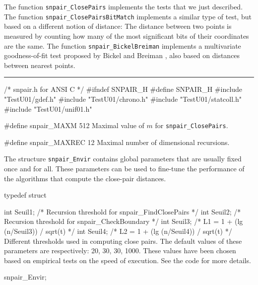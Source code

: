 The function {\tt snpair\_ClosePairs} implements the tests that we
just described.  The function {\tt snpair\_ClosePairsBitMatch}
implements a similar type of test, but based on a different notion of
distance: The distance between two points is measured by counting
how many of the most significant bits of their coordinates are the same.
The function {\tt snpair\_BickelBreiman} implements a multivariate
goodness-of-fit test proposed by Bickel and Breiman \cite{tBIC83a},
also based on distances between nearest points.


\bigskip\hrule

\code\hide
/* snpair.h  for ANSI C */
#ifndef SNPAIR_H
#define SNPAIR_H
\endhide
#include "TestU01/gdef.h"
#include "TestU01/chrono.h"
#include "TestU01/statcoll.h"
#include "TestU01/unif01.h"
\endcode




\code


#define snpair_MAXM 512
\endcode
\tab
  Maximal value of $m$ for  {\tt snpair\_ClosePairs}.
\endtab
\code


#define snpair_MAXREC 12
\endcode
\tab
 Maximal number of dimensional recursions.
\endtab

\ifdetailed  %


The structure {\tt snpair\_Envir} contains global parameters
that are usually fixed once and for all.
These parameters can be used to fine-tune the performance of
the algorithms that compute the close-pair distances.

\code

typedef struct {

   int Seuil1;        /* Recursion threshold for snpair_FindClosePairs */
   int Seuil2;        /* Recursion threshold for snpair_CheckBoundary  */
   int Seuil3;        /* L1 = 1 + (lg (n/Seuil3)) / sqrt(t) */
   int Seuil4;        /* L2 = 1 + (lg (n/Seuil4)) / sqrt(t) */
\endcode
 \tabb
  Different thresholds used in computing close pairs.
  The default values of these parameters are respectively:
  20, 30, 30, 1000.  These values have been chosen based on
  empirical  tests on the speed of execution.
  See the code for more details.
 \endtabb
\code

} snpair_Envir;



